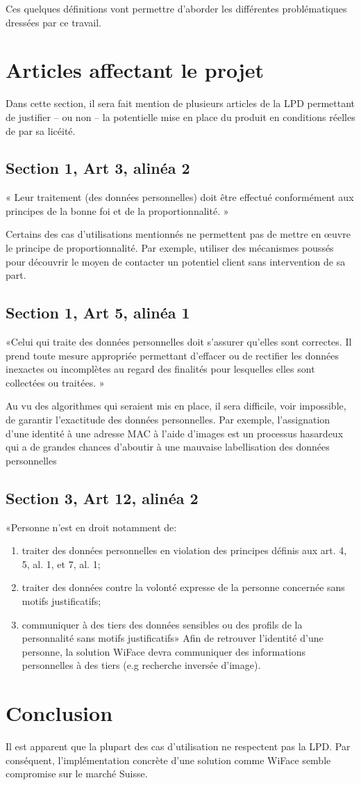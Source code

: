 Ces quelques définitions vont permettre d’aborder les différentes problématiques dressées par ce travail.

\section{Articles affectant le projet}

Dans cette section, il sera fait mention de plusieurs articles de la LPD permettant de justifier – ou non – la potentielle
mise en place du produit en conditions réelles de par sa licéité.

\subsection{Section 1, Art 3, alinéa 2}
« Leur traitement (des données personnelles) doit être effectué conformément aux principes de la bonne foi et de
la proportionnalité. »

Certains des cas d’utilisations mentionnés ne permettent pas de mettre en œuvre le principe de proportionnalité.
Par exemple, utiliser des mécanismes poussés pour découvrir le moyen de contacter un potentiel client sans
intervention de sa part.

\subsection{Section 1, Art 5, alinéa 1}
«Celui qui traite des données personnelles doit s’assurer qu’elles sont correctes. Il prend toute mesure appropriée
permettant d’effacer ou de rectifier les données inexactes ou incomplètes au regard des finalités pour lesquelles
elles sont collectées ou traitées. »

Au vu des algorithmes qui seraient mis en place, il sera difficile, voir impossible, de garantir l’exactitude des données
personnelles. Par exemple, l’assignation d’une identité à une adresse MAC à l’aide d’images est un processus
hasardeux qui a de grandes chances d’aboutir à une mauvaise labellisation des données personnelles

\subsection{Section 3, Art 12, alinéa 2}
«Personne n’est en droit notamment de:
\begin{enumerate}[label=\alph*]
\item traiter des données personnelles en violation des principes définis aux art. 4, 5, al. 1, et 7, al. 1;
\item traiter des données contre la volonté expresse de la personne concernée sans motifs justificatifs;
\item communiquer à des tiers des données sensibles ou des profils de la personnalité sans motifs justificatifs»
Afin de retrouver l’identité d’une personne, la solution WiFace devra communiquer des informations personnelles
à des tiers (e.g recherche inversée d’image).
\end{enumerate}

\section{Conclusion}
Il est apparent que la plupart des cas d’utilisation ne respectent pas la LPD. Par conséquent, l’implémentation
concrète d’une solution comme WiFace semble compromise sur le marché Suisse.


